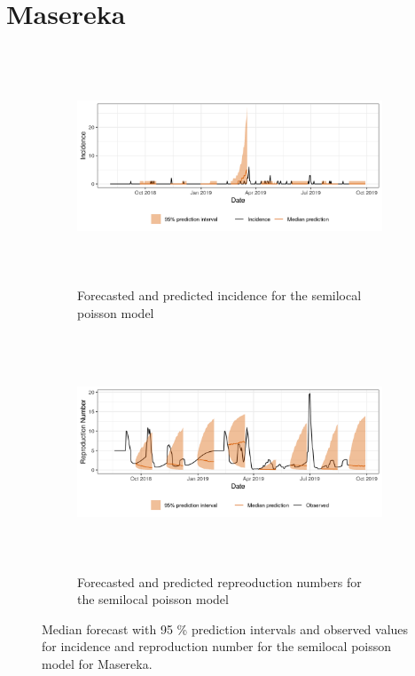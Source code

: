  \section{ Masereka }\begin{figure}[H]\begin{subfigure}{\textwidth}  \centering  \includegraphics[width=0.9\linewidth, height=7cm]{../output/Masereka_predictions.png}  \caption{Forecasted and predicted incidence for the semilocal poisson model}\end{subfigure}

\begin{subfigure}{\textwidth}  \centering  \includegraphics[width=0.9\linewidth, height=7cm]{../output/Masereka_Rs.png}  \caption{Forecasted and predicted repreoduction numbers for the semilocal poisson model}\end{subfigure}  \caption{Median forecast with 95 \% prediction intervals and observed values for incidence and reproduction number for the semilocal poisson model for Masereka.}\end{figure}

